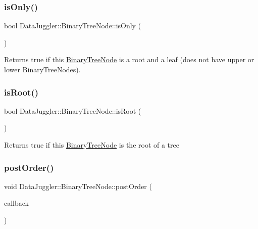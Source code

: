 \subsubsection{\texorpdfstring{is\+Only()}{isOnly()}}
{\footnotesize\ttfamily bool Data\+Juggler\+::\+Binary\+Tree\+Node\+::is\+Only (\begin{DoxyParamCaption}{ }\end{DoxyParamCaption})}

Returns true if this \hyperlink{classDataJuggler_1_1BinaryTreeNode}{Binary\+Tree\+Node} is a root and a leaf (does not have upper or lower Binary\+Tree\+Nodes). \mbox{\label{classDataJuggler_1_1BinaryTreeNode_a51c9d0cc830439528546be1d2c42ce72}} 
\subsubsection{\texorpdfstring{is\+Root()}{isRoot()}}
{\footnotesize\ttfamily bool Data\+Juggler\+::\+Binary\+Tree\+Node\+::is\+Root (\begin{DoxyParamCaption}{ }\end{DoxyParamCaption})}

Returns true if this \hyperlink{classDataJuggler_1_1BinaryTreeNode}{Binary\+Tree\+Node} is the root of a tree \mbox{\label{classDataJuggler_1_1BinaryTreeNode_ad52d331c7d393615f76bb18657dc7c0b}} 
\subsubsection{\texorpdfstring{post\+Order()}{postOrder()}}
{\footnotesize\ttfamily void Data\+Juggler\+::\+Binary\+Tree\+Node\+::post\+Order (\begin{DoxyParamCaption}\item[{function$<$ void(\hyperlink{classDataJuggler_1_1BinaryTreeNode}{Binary\+Tree\+Node} $\ast$)$>$}]{callback }\end{DoxyParamCaption})}

